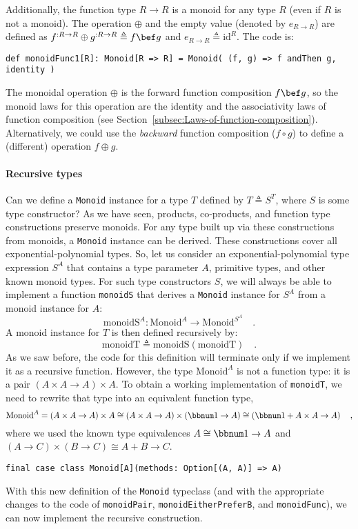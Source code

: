 Additionally, the function type $R\rightarrow R$ is a monoid for
any type $R$ (even if $R$ is not a monoid). The operation $\oplus$
and the empty value (denoted by $e_{R\rightarrow R}$) are defined
as $f^{:R\rightarrow R}\oplus g^{:R\rightarrow R}\triangleq f\bef g$
and $e_{R\rightarrow R}\triangleq\text{id}^{R}$. The code is:
\begin{lstlisting}
def monoidFunc1[R]: Monoid[R => R] = Monoid( (f, g) => f andThen g, identity )
\end{lstlisting}
The monoidal operation $\oplus$ is the forward function composition
$f\bef g$, so the monoid laws for this operation are the identity
and the associativity laws of function composition (see Section~\ref{subsec:Laws-of-function-composition}).
Alternatively, we could use the \emph{backward} function composition
($f\circ g$) to define a (different) operation $f\oplus g$.

\paragraph{Recursive types}

Can we define a \lstinline!Monoid! instance for a type $T$ defined
by $T\triangleq S^{T}$, where $S$ is some type constructor? As we
have seen, products, co-products, and function type constructions
preserve monoids. For any type built up via these constructions from
monoids, a \lstinline!Monoid! instance can be derived. These constructions
cover all exponential-polynomial types. So, let us consider an exponential-polynomial
type expression $S^{A}$ that contains a type parameter $A$, primitive
types, and other known monoid types. For such type constructors $S$,
we will always be able to implement a function \lstinline!monoidS!
that derives a \lstinline!Monoid! instance for $S^{A}$ from a monoid
instance for $A$:
\[
\text{monoidS}^{A}:\text{Monoid}^{A}\rightarrow\text{Monoid}^{S^{A}}\quad.
\]
A monoid instance for $T$ is then defined recursively by:
\[
\text{monoidT}\triangleq\text{monoidS}\left(\text{monoidT}\right)\quad.
\]
As we saw before, the code for this definition will terminate only
if we implement it as a recursive function. However, the type $\text{Monoid}^{A}$
is not a function type: it is a pair $\left(A\times A\rightarrow A\right)\times A$.
To obtain a working implementation of \lstinline!monoidT!, we need
to rewrite that type into an equivalent function type,
\[
\text{Monoid}^{A}=\left(A\times A\rightarrow A\right)\times A\cong\left(A\times A\rightarrow A\right)\times\left(\bbnum 1\rightarrow A\right)\cong\left(\bbnum 1+A\times A\rightarrow A\right)\quad,
\]
where we used the known type equivalences $A\cong\bbnum 1\rightarrow A$
and $\left(A\rightarrow C\right)\times\left(B\rightarrow C\right)\cong A+B\rightarrow C$.
\begin{lstlisting}
final case class Monoid[A](methods: Option[(A, A)] => A)
\end{lstlisting}
With this new definition of the \lstinline!Monoid! typeclass (and
with the appropriate changes to the code of \lstinline!monoidPair!,
\lstinline!monoidEitherPreferB!, and \lstinline!monoidFunc!), we
can now implement the recursive construction.

